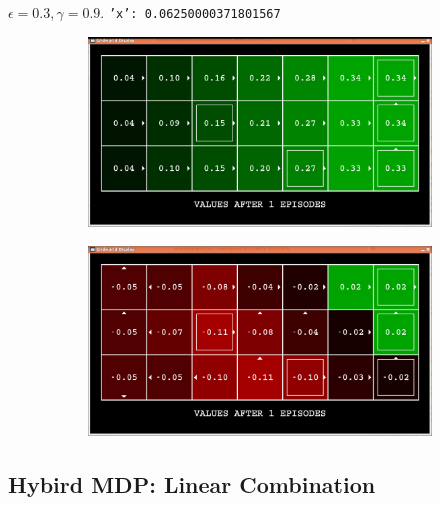 \documentclass[11pt]{article}
\begin{document}
\begin{figure}[h!]
\begin{subfigure}{0.49\textwidth}
\end{subfigure}
\label{fig:rep}
\end{figure}

$\epsilon = 0.3, \gamma = 0.9$.
\texttt{{'x': 0.06250000371801567}}

\begin{figure}[h!]
\centering
\begin{subfigure}{0.9\textwidth}
	\includegraphics[width=\textwidth]{figure/hybird_walk}
\end{subfigure}
\begin{subfigure}{0.9\textwidth}
	\includegraphics[width=\textwidth]{figure/hybird_obstacle}
\end{subfigure}
\label{fig:rep}
\end{figure}

\subsection{Hybird MDP: Linear Combination}
\end{document}
